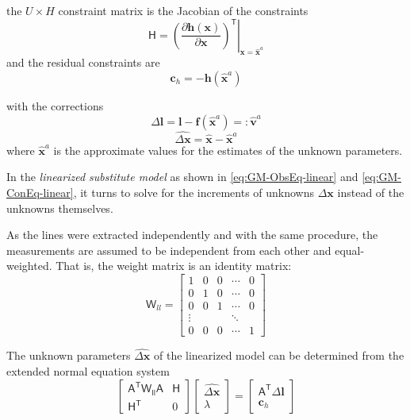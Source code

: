 the $U\times H$ constraint matrix is the Jacobian of the constraints
\begin{equation*}
\mathsf{H}=\left.\left(\dfrac{\partial\boldsymbol h(\boldsymbol x)}{\partial\boldsymbol x}\right)^\mathsf{T}\right|_{\boldsymbol x=\widehat{\boldsymbol x}^a}
\end{equation*}
and the residual constraints are %
\begin{equation*}
\boldsymbol c_h=-\boldsymbol h(\widehat{\boldsymbol x}^a)
\end{equation*}

with the corrections
\begin{equation} \label{eq:GM-ObsEq-linear-l}
\Delta\boldsymbol l=\boldsymbol l-\boldsymbol f(\widehat{\boldsymbol x}^a)=:\widehat{\boldsymbol v}^a
\end{equation}
\begin{equation} \label{eq:GM-ObsEq-linear-x}
\widehat{\Delta\boldsymbol x}=\widehat{\boldsymbol x}-\widehat{\boldsymbol x}^a
\end{equation}
where $\widehat{\boldsymbol x}^a$ is the approximate values for the estimates of the unknown parameters.

In the \textit{linearized substitute model} as shown in \eqref{eq:GM-ObsEq-linear} and \eqref{eq:GM-ConEq-linear}, it turns to solve for the increments of unknowns $\Delta\boldsymbol x$ instead of the unknowns themselves.

As the lines were extracted independently and with the same procedure, the measurements are assumed to be independent from each other and equal-weighted. That is, the weight matrix is an identity matrix:
\begin{equation}
\mathsf{W}_{ll}=
\begin{bmatrix}
1&0&0&\cdots &0\\
0&1&0&\cdots &0\\
0&0&1&\cdots &0\\
\vdots&&&\ddots&\\
0&0&0&\cdots &1
\end{bmatrix}
\end{equation}


The unknown parameters $\widehat{\Delta\boldsymbol x}$ of the linearized model can be determined from the extended normal equation system
\begin{equation}
\begin{bmatrix}
\mathsf{A^T\mathsf{W}_{ll}A} & \mathsf{H}\\
\mathsf{H^T} & 0
\end{bmatrix}
\begin{bmatrix}
\widehat{\Delta\boldsymbol x}\\
\lambda
\end{bmatrix}
=
\begin{bmatrix}
\mathsf{A^T}\Delta\boldsymbol l\\
\boldsymbol c_h
\end{bmatrix}
\end{equation}

